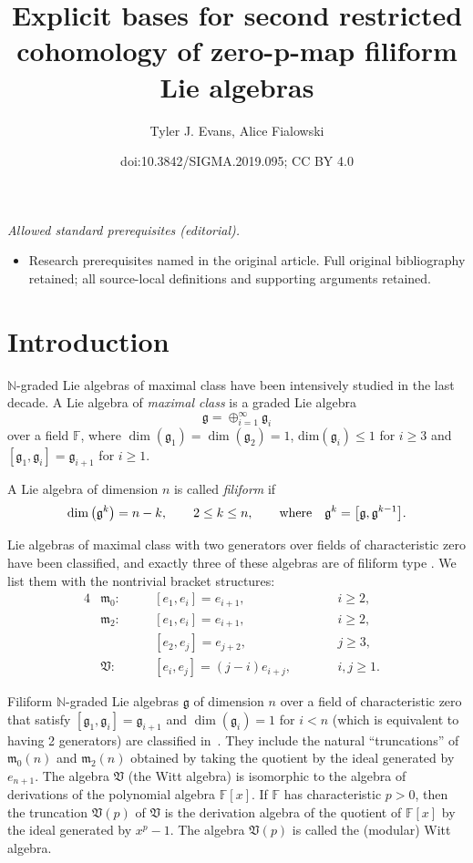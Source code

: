 \documentclass[10pt,a4paper]{amsart}
\title{Explicit bases for second restricted cohomology of zero-p-map filiform Lie algebras}
\author{Tyler J. Evans, Alice Fialowski}
\date{doi:10.3842/SIGMA.2019.095; CC BY 4.0}
\def\g{\mathfrak g}
\def\m{\mathfrak m}
\def\V{\mathfrak V}
\def\F{\mathbb F}
\def\N{\mathbb N}
\numberwithin{equation}{section}
\begin{document}
\maketitle
\noindent\textit{Allowed standard prerequisites (editorial).}\begin{itemize}
\item Research prerequisites named in the original article. Full original bibliography retained; all source-local definitions and supporting arguments retained.
\end{itemize}\medskip
\section{Introduction}
$\N$-graded Lie algebras of maximal class have been intensively studied in the last decade. A Lie algebra of \emph{maximal class} is
a graded Lie algebra
\[
 \g=\oplus_{i=1}^{\infty}\g_i
\]
over a field $\F$, where $\dim(\g_1)=\dim(\g_2)=1$, dim$(\g_i) \leq 1$
for $i \ge 3$ and $[\g_1,\g_i]= \g_{i+1}$ for $i \ge 1$.

A Lie algebra of dimension $n$ is called \emph{filiform} if
\[\dim\big(\g^k\big)=n-k,\qquad 2 \le k \le n,\qquad {\rm where} \quad \g^k=\big[\g,\g^{k-1}\big].\]

Lie algebras of maximal class with two generators over fields of characteristic zero have been classified, and exactly three of these algebras are of filiform type \cite{Fialowski1983}. We list them with the nontrivial bracket structures:
\begin{alignat*}{4}
& \m_0\colon \quad&& [e_1 ,e_i]= e_{i+1}, \qquad && i \ge 2,&\\
& \m_2\colon \quad&& [e_1, e_i]= e_{i+1}, \qquad && i \ge 2,&\\
&&& [e_2, e_j] = e_{j+2}, \qquad && j \ge 3, &\\
& \V\colon \quad && [e_i, e_j] = (j-i)e_{i+j}, \qquad && i, j \ge 1.&
\end{alignat*}

Filiform $\N$-graded Lie algebras $\g$ of dimension $n$ over a field of characteristic zero that satisfy $[\g_1,\g_i]=\g_{i+1}$ and $\dim(\g_i)=1$ for $i<n$ (which is equivalent to having 2 generators) are classified in~\cite{Millionschikov2004}. They include the natural ``truncations'' of $\m_0(n)$ and $\m_2(n)$ obtained by taking the quotient by the ideal generated by $e_{n+1}$. The algebra $\V$ (the Witt algebra) is isomorphic to the algebra of derivations of the polynomial algebra $\F[x]$. If $\F$ has characteristic $p>0$, then the truncation $\V(p)$ of $\V$ is the derivation algebra of the quotient of $\F[x]$ by the ideal generated by $x^p-1$. The algebra $\V(p)$ is called the (modular) Witt algebra.
\end{document}
